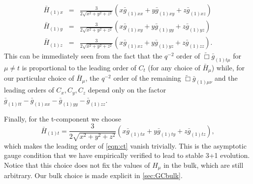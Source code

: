 \documentclass[a4paper,11pt]{article}
\begin{document}
\begin{eqnarray}\label{eqn:target_gauge_xyz}
\bar{H}_{(1)x}&=&\frac{3}{2\sqrt{x^2+y^2+z^2}}(x \bar{g}_{(1)xx}+y\bar{g}_{(1)xy}+z\bar{g}_{(1)xz}) \nonumber \\
\bar{H}_{(1)y}&=&\frac{3}{2\sqrt{x^2+y^2+z^2}}(x \bar{g}_{(1)xy}+y\bar{g}_{(1)yy}+z\bar{g}_{(1)yz}) \nonumber \\
\bar{H}_{(1)z}&=&\frac{3}{2\sqrt{x^2+y^2+z^2}}(x \bar{g}_{(1)xz}+y\bar{g}_{(1)yz}+z\bar{g}_{(1)zz}).
\end{eqnarray}
This can be immediately seen from the fact that the $q^{-2}$ order of $\tilde{\Box}\bar{g}_{(1)t\mu}$ for $\mu\neq t$ is proportional to the leading order of $C_t$ (for any choice of $\bar{H}_\mu$) while, for our particular choice of $\bar{H}_\mu$, the $q^{-2}$ order of the remaining $\tilde{\Box}\bar{g}_{(1)\mu\nu}$ and the leading orders of $C_x,C_y,C_z$ depend only on the factor $\bar{g}_{(1)tt}-\bar{g}_{(1)xx}-\bar{g}_{(1)yy}-\bar{g}_{(1)zz}$.

Finally, for the t-component we choose
\begin{equation}\label{eqn:target_gauge_t}
\bar{H}_{(1)t}=\frac{3}{2\sqrt{x^2+y^2+z^2}}(x \bar{g}_{(1)tx}+y\bar{g}_{(1)ty}+z\bar{g}_{(1)tz}),
\end{equation}
which makes the leading order of \eqref{eqn:ct} vanish trivially.
This is the asymptotic gauge condition that we have empirically verified to lead to stable 3+1 evolution. Notice that this choice does not fix the values of $H_\mu$ in the bulk, which are still arbitrary. Our bulk choice is made explicit in \ref{sec:GCbulk}.
\end{document}
